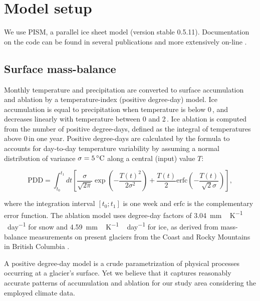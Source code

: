 
\section{Model setup}
\label{sec:model}

We use PISM, a parallel ice sheet model (version stable 0.5.11). Documentation on the code can be found in several publications \citep[e.g.,][]{bueler-brown-2009,winkelmann-etal-2011,aschwanden-etal-2012} and more extensively on-line \citep[{\url{http://www.pism-docs.org}},][]{web:pism}.

\subsection{Surface mass-balance}

Monthly temperature and precipitation are converted to surface accumulation and ablation by a temperature-index (positive degree-day) model. Ice accumulation is equal to precipitation when temperature is below 0\,\degC, and decreases linearly with temperature between 0 and 2\,\degC. Ice ablation is computed from the number of positive degree-days, defined as the integral of temperatures above 0\,\degC in one year. Positive degree-days are calculated by the \citet{calov-greve-2005} formula to accounts for day-to-day temperature variability by assuming a normal distribution of variance $\sigma=5\,\mathrm{^{\circ} C}$ along a central (input) value $T$:

\begin{equation}
	\mathrm{PDD} = \int_{t_0}^{t_1} dt \left[
		\frac{\sigma}{\sqrt{2\pi}}
		\exp\left({-\frac{T(t)^2}{2\sigma^2}}\right)
		+\frac{T(t)}{2}
		\mathrm{erfc} \left(-\frac{T(t)}{\sqrt{2}\sigma}\right)
	\right],
\end{equation}

where the integration interval $[t_0; t_1]$ is one week and $\mathrm{erfc}$ is the complementary error function. The ablation model uses degree-day factors of 3.04~\unit{mm\,K^{-1}\,day^{-1}} for snow and 4.59~\unit{mm\,K^{-1}\,day^{-1}} for ice, as derived from mass-balance measurements on present glaciers from the Coast and Rocky Mountains in British Columbia \citep{shea-etal-2009}.

A positive degree-day model is a crude parametrization of physical processes occurring at a glacier's surface. Yet we believe that it captures reasonably accurate patterns of accumulation and ablation for our study area considering the employed climate data.

